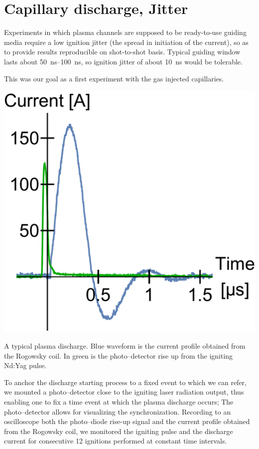 \documentclass[../main.tex]{subfiles}
\begin{document}
\section{Capillary discharge, Jitter}\label{sec:jitter}
Experiments in which plasma channels are supposed to be ready-to-use guiding media require a low ignition jitter (the spread in initiation of the current), so as to provide results reproducible on shot-to-shot basis. Typical guiding window lasts about \SIrange{50}{100}{\ns}, so ignition jitter of about \SI{10}{ns} would be tolerable.

This was our goal as a first experiment with the gas injected capillaries.

\begin{marginfigure}
    \includegraphics[width=\marginparwidth]{figures/jitter/discharge_sample.pdf}
    \caption{A typical plasma discharge. Blue waveform is the current profile obtained from the Rogowsky coil. In green is the photo--detector rise up from the igniting Nd:Yag pulse.}
    \label{fig:discharge_sample}
\end{marginfigure}
To anchor the discharge starting process to a fixed event to which we can refer, we mounted a photo--detector close to the igniting laser radiation output, thus enabling one to fix a time event at which the plasma discharge occurs; The photo--detector allows for visualizing the synchronization. Recording to an oscilloscope both the photo--diode rise-up signal and the current profile obtained from the Rogowsky coil, we monitored the igniting pulse and the discharge current for consecutive 12 ignitions performed at constant time intervals.
\end{document}
